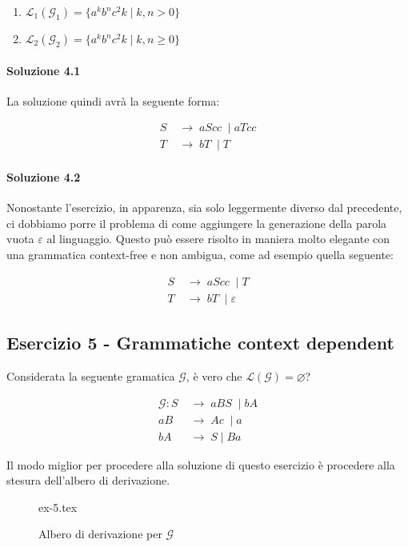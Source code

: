 \documentclass[class=book, crop=false, oneside, 12pt]{standalone}
\begin{document}
\begin{enumerate}
  \item \(\mathcal{L}_1(\mathcal{G}_1) = \{ a^k b^n c^2k \mid k, n > 0 \}\)
  \item \(\mathcal{L}_2(\mathcal{G}_2) = \{ a^k b^n c^2k \mid k, n \geq 0 \}\)
\end{enumerate}

\paragraph{Soluzione 4.1}
La soluzione quindi avrà la seguente forma:

\begin{align*}
  S\; &\to\; aScc\; \mid  aTcc \\
  T\; &\to\; bT\; \mid T
\end{align*}

\paragraph{Soluzione 4.2}
Nonostante l'esercizio, in apparenza, sia solo leggermente diverso dal precedente, ci dobbiamo porre il problema di come aggiungere la generazione della parola vuota \(\varepsilon\) al linguaggio. Questo può essere risolto in maniera molto elegante con una grammatica context-free e non ambigua, come ad esempio quella seguente:

\begin{align*}
  S\; &\to\; aScc\; \mid T \\
  T\; &\to\; bT\; \mid \varepsilon
\end{align*}

\subsection*{Esercizio 5 - Grammatiche context dependent}
Considerata la seguente gramatica \(\mathcal{G}\), è vero che \(\mathcal{L(G)} = \varnothing\)?

\begin{align*}
  \mathcal{G}: S\; &\to\; aBS\; \mid bA \\
  aB\; &\to\; Ac\; \mid a \\
  bA\; &\to\; S \mid Ba
\end{align*}

\noindent Il modo miglior per procedere alla soluzione di questo esercizio è procedere alla stesura dell'albero di derivazione.

\begin{figure}[H]
	\centering
	{ex-5.tex}
	\caption{Albero di derivazione per \(\mathcal{G}\)}
\end{figure}
\end{document}
